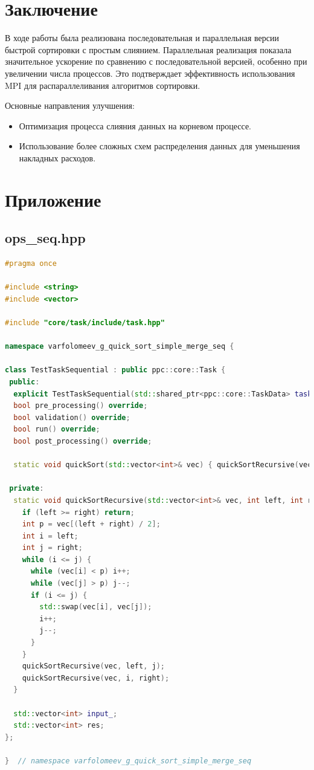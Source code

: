 \documentclass[a4paper,12pt]{article}
\begin{document}
\newpage

\section{Заключение}
В ходе работы была реализована последовательная и параллельная версии быстрой сортировки с простым слиянием. Параллельная реализация показала значительное ускорение по сравнению с последовательной версией, особенно при увеличении числа процессов. Это подтверждает эффективность использования MPI для распараллеливания алгоритмов сортировки.

Основные направления улучшения:
\begin{itemize}
    \item Оптимизация процесса слияния данных на корневом процессе.
    \item Использование более сложных схем распределения данных для уменьшения накладных расходов.
\end{itemize}

\newpage

\section{Приложение}

\subsection{ops\_seq.hpp}
\begin{lstlisting}[language=C++]
#pragma once

#include <string>
#include <vector>

#include "core/task/include/task.hpp"

namespace varfolomeev_g_quick_sort_simple_merge_seq {

class TestTaskSequential : public ppc::core::Task {
 public:
  explicit TestTaskSequential(std::shared_ptr<ppc::core::TaskData> taskData_) : Task(std::move(taskData_)) {}
  bool pre_processing() override;
  bool validation() override;
  bool run() override;
  bool post_processing() override;

  static void quickSort(std::vector<int>& vec) { quickSortRecursive(vec, 0, vec.size() - 1); }

 private:
  static void quickSortRecursive(std::vector<int>& vec, int left, int right) {
    if (left >= right) return;
    int p = vec[(left + right) / 2];
    int i = left;
    int j = right;
    while (i <= j) {
      while (vec[i] < p) i++;
      while (vec[j] > p) j--;
      if (i <= j) {
        std::swap(vec[i], vec[j]);
        i++;
        j--;
      }
    }
    quickSortRecursive(vec, left, j);
    quickSortRecursive(vec, i, right);
  }

  std::vector<int> input_;
  std::vector<int> res;
};

}  // namespace varfolomeev_g_quick_sort_simple_merge_seq
\end{lstlisting}
\end{document}

